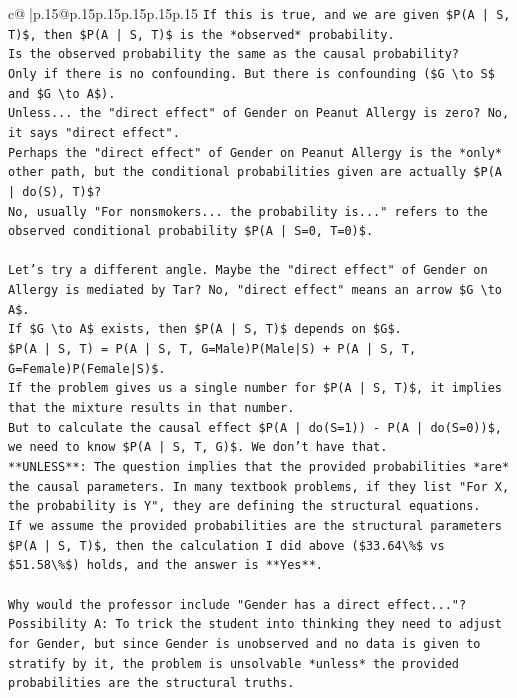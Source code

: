 \documentclass{article}
\begin{document}
{\begin{supertabular}{c@{$\;$}|p{.15\linewidth}@{}p{.15\linewidth}p{.15\linewidth}p{.15\linewidth}p{.15\linewidth}p{.15\linewidth}}
{{{\texttt{If this is true, and we are given \$P(A | S, T)\$, then \$P(A | S, T)\$ is the *observed* probability.} \\
\texttt{Is the observed probability the same as the causal probability?} \\
\texttt{Only if there is no confounding. But there is confounding (\$G \textbackslash{}to S\$ and \$G \textbackslash{}to A\$).} \\
\texttt{Unless... the "direct effect" of Gender on Peanut Allergy is zero? No, it says "direct effect".} \\
\texttt{Perhaps the "direct effect" of Gender on Peanut Allergy is the *only* other path, but the conditional probabilities given are actually \$P(A | do(S), T)\$?} \\
\texttt{No, usually "For nonsmokers... the probability is..." refers to the observed conditional probability \$P(A | S=0, T=0)\$.} \\
\\ 
\texttt{Let's try a different angle. Maybe the "direct effect" of Gender on Allergy is mediated by Tar? No, "direct effect" means an arrow \$G \textbackslash{}to A\$.} \\
\texttt{If \$G \textbackslash{}to A\$ exists, then \$P(A | S, T)\$ depends on \$G\$.} \\
\texttt{\$P(A | S, T) = P(A | S, T, G=Male)P(Male|S) + P(A | S, T, G=Female)P(Female|S)\$.} \\
\texttt{If the problem gives us a single number for \$P(A | S, T)\$, it implies that the mixture results in that number.} \\
\texttt{But to calculate the causal effect \$P(A | do(S=1)) {-} P(A | do(S=0))\$, we need to know \$P(A | S, T, G)\$. We don't have that.} \\
\texttt{**UNLESS**: The question implies that the provided probabilities *are* the causal parameters. In many textbook problems, if they list "For X, the probability is Y", they are defining the structural equations.} \\
\texttt{If we assume the provided probabilities are the structural parameters \$P(A | S, T)\$, then the calculation I did above (\$33.64\textbackslash{}\%\$ vs \$51.58\textbackslash{}\%\$) holds, and the answer is **Yes**.} \\
\\ 
\texttt{Why would the professor include "Gender has a direct effect..."?} \\
\texttt{Possibility A: To trick the student into thinking they need to adjust for Gender, but since Gender is unobserved and no data is given to stratify by it, the problem is unsolvable *unless* the provided probabilities are the structural truths.} \\
}}}
\end{supertabular}}
\end{document}

